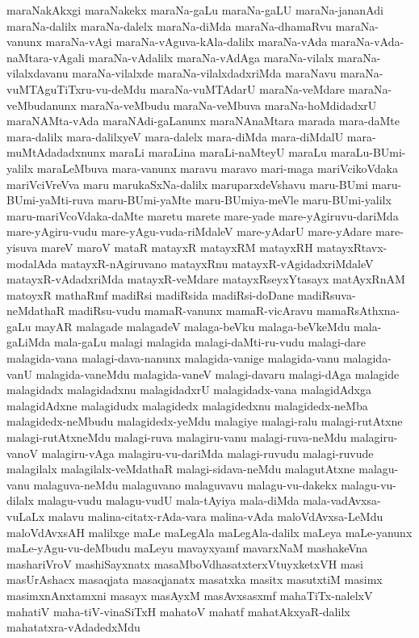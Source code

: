 {maraNakAkxgi
maraNakekx
maraNa-gaLu
maraNa-gaLU
maraNa-jananAdi
maraNa-dalilx
maraNa-dalelx
maraNa-diMda
maraNa-dhamaRvu
maraNa-vanunx
maraNa-vAgi
maraNa-vAguva-kAla-dalilx
maraNa-vAda
maraNa-vAda-naMtara-vAgali
maraNa-vAdalilx
maraNa-vAdAga
maraNa-vilalx
maraNa-vilalxdavanu
maraNa-vilalxde
maraNa-vilalxdadxriMda
maraNavu
maraNa-vuMTAguTiTxru-vu-deMdu
maraNa-vuMTAdarU
maraNa-veMdare
maraNa-veMbudanunx
maraNa-veMbudu
maraNa-veMbuva
maraNa-hoMdidadxrU
maraNAMta-vAda
maraNAdi-gaLanunx
maraNAnaMtara
marada
mara-daMte
mara-dalilx
mara-dalilxyeV
mara-dalelx
mara-diMda
mara-diMdalU
mara-muMtAdadadxnunx
maraLi
maraLina
maraLi-naMteyU
maraLu
maraLu-BUmi-yalilx
maraLeMbuva
mara-vanunx
maravu
maravo
mari-maga
mariVcikoVdaka
mariVciVreVva
maru
marukaSxNa-dalilx
maruparxdeVshavu
maru-BUmi
maru-BUmi-yaMti-ruva
maru-BUmi-yaMte
maru-BUmiya-meVle
maru-BUmi-yalilx
maru-mariVcoVdaka-daMte
maretu
marete
mare-yade
mare-yAgiruvu-dariMda
mare-yAgiru-vudu
mare-yAgu-vuda-riMdaleV
mare-yAdarU
mare-yAdare
mare-yisuva
mareV
maroV
mataR
matayxR
matayxRM
matayxRH
matayxRtavx-modalAda
matayxR-nAgiruvano
matayxRnu
matayxR-vAgidadxriMdaleV
matayxR-vAdadxriMda
matayxR-veMdare
matayxRseyxYtasayx
matAyxRnAM
matoyxR
mathaRmf
madiRsi
madiRsida
madiRsi-doDane
madiRsuva-neMdathaR
madiRsu-vudu
mamaR-vanunx
mamaR-vicAravu
mamaRsAthxna-gaLu
mayAR
malagade
malagadeV
malaga-beVku
malaga-beVkeMdu
mala-gaLiMda
mala-gaLu
malagi
malagida
malagi-daMti-ru-vudu
malagi-dare
malagida-vana
malagi-dava-nanunx
malagida-vanige
malagida-vanu
malagida-vanU
malagida-vaneMdu
malagida-vaneV
malagi-davaru
malagi-dAga
malagide
malagidadx
malagidadxnu
malagidadxrU
malagidadx-vana
malagidAdxga
malagidAdxne
malagidudx
malagidedx
malagidedxnu
malagidedx-neMba
malagidedx-neMbudu
malagidedx-yeMdu
malagiye
malagi-ralu
malagi-rutAtxne
malagi-rutAtxneMdu
malagi-ruva
malagiru-vanu
malagi-ruva-neMdu
malagiru-vanoV
malagiru-vAga
malagiru-vu-dariMda
malagi-ruvudu
malagi-ruvude
malagilalx
malagilalx-veMdathaR
malagi-sidava-neMdu
malagutAtxne
malagu-vanu
malaguva-neMdu
malaguvano
malaguvavu
malagu-vu-dakekx
malagu-vu-dilalx
malagu-vudu
malagu-vudU
mala-tAyiya
mala-diMda
mala-vadAvxsa-vuLaLx
malavu
malina-citatx-rAda-vara
malina-vAda
maloVdAvxsa-LeMdu
maloVdAvxsAH
malilxge
maLe
maLegAla
maLegAla-dalilx
maLeya
maLe-yanunx
maLe-yAgu-vu-deMbudu
maLeyu
mavayxyamf
mavarxNaM
mashakeVna
mashariVroV
mashiSayxnatx
masaMboVdhasatxterxVtuyxketxVH
masi
masUrAshacx
masaqjata
masaqjanatx
masatxka
masitx
masutxtiM
masimx
masimxnAnxtamxni
masayx
masAyxM
masAvxsasxmf
mahaTiTx-nalelxV
mahatiV
maha-tiV-vinaSiTxH
mahatoV
mahatf
mahatAkxyaR-dalilx
mahatatxra-vAdadedxMdu
}

